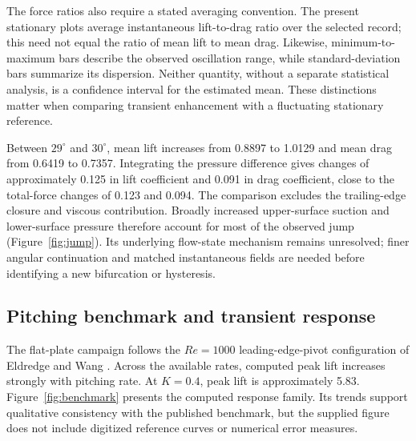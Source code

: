 The force ratios also require a stated averaging convention. The present stationary plots average instantaneous lift-to-drag ratio over the selected record; this need not equal the ratio of mean lift to mean drag. Likewise, minimum-to-maximum bars describe the observed oscillation range, while standard-deviation bars summarize its dispersion. Neither quantity, without a separate statistical analysis, is a confidence interval for the estimated mean. These distinctions matter when comparing transient enhancement with a fluctuating stationary reference.

Between $29^\circ$ and $30^\circ$, mean lift increases from 0.8897 to 1.0129 and mean drag from 0.6419 to 0.7357. Integrating the pressure difference gives changes of approximately 0.125 in lift coefficient and 0.091 in drag coefficient, close to the total-force changes of 0.123 and 0.094. The comparison excludes the trailing-edge closure and viscous contribution. Broadly increased upper-surface suction and lower-surface pressure therefore account for most of the observed jump (Figure~\ref{fig:jump}). Its underlying flow-state mechanism remains unresolved; finer angular continuation and matched instantaneous fields are needed before identifying a new bifurcation or hysteresis.


\subsection{Pitching benchmark and transient response}
The flat-plate campaign follows the $Re=1000$ leading-edge-pivot configuration of Eldredge and Wang \cite{eldredge2010}. Across the available rates, computed peak lift increases strongly with pitching rate. At $K=0.4$, peak lift is approximately 5.83. Figure~\ref{fig:benchmark} presents the computed response family. Its trends support qualitative consistency with the published benchmark, but the supplied figure does not include digitized reference curves or numerical error measures. 


